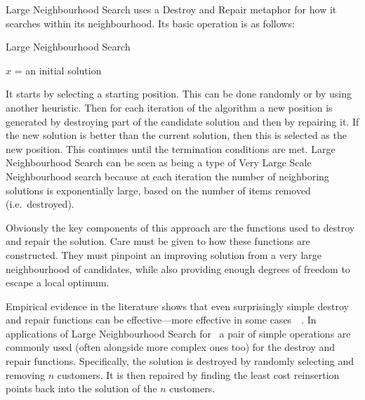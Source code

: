 Large Neighbourhood Search uses a Destroy and Repair metaphor for how it searches within its neighbourhood. Its basic operation is as follows:

\begin{algorithm}[H]
   \caption{Large Neighbourhood Search}
   $x$ = an initial solution\\
\end{algorithm}

It starts by selecting a starting position. This can be done randomly or by using another heuristic. Then for each iteration of the algorithm a new position is generated by destroying part of the candidate solution and then by repairing it. If the new solution is better than the current solution, then this is selected as the new position. This continues until the termination conditions are met. Large Neighbourhood Search can be seen as being a type of Very Large Scale Neighbourhood search because at each iteration the number of neighboring solutions is exponentially large, based on the number of items removed (i.e.~destroyed).

Obviously the key components of this approach are the functions used to destroy and repair the solution. Care must be given to how these functions are constructed. They must pinpoint an improving solution from a very large neighbourhood of candidates, while also providing enough degrees of freedom to escape a local optimum.

Empirical evidence in the literature shows that even surprisingly simple destroy and repair functions can be effective---more effective in some cases~\cite{Shaw:1998}~\cite{Ropke:2005}. In applications of Large Neighbourhood Search for \VRP\ a pair of simple operations are commonly used (often alongside more complex ones too) for the destroy and repair functions. Specifically, the solution is destroyed by randomly selecting and removing $n$ customers. It is then repaired by finding the least cost reinsertion points back into the solution of the $n$ customers.

